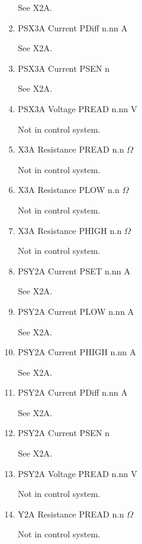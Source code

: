 \documentclass[11pt]{book}		%
\begin{document}
\begin{enumerate}
\color{red}
See X2A.
\color{black}

 \item PSX3A Current PDiff n.nn A

\color{red}
See X2A.
\color{black}

 \item PSX3A Current PSEN  n

\color{red}
See X2A.
\color{black}

 \item PSX3A Voltage PREAD n.nn V

\color{red}
Not in control system.
\color{black}

 \item X3A Resistance PREAD n.n $\Omega$

\color{red}
Not in control system.
\color{black}

 \item X3A Resistance PLOW n.n $\Omega$

\color{red}
Not in control system.
\color{black}

 \item X3A Resistance PHIGH n.n $\Omega$

\color{red}
Not in control system.
\color{black}

 \item PSY2A Current PSET  n.nn A

\color{red}
See X2A.
\color{black}

 \item PSY2A Current PLOW  n.nn A

\color{red}
See X2A.
\color{black}

 \item PSY2A Current PHIGH n.nn A

\color{red}
See X2A.
\color{black}

 \item PSY2A Current PDiff n.nn A

\color{red}
See X2A.
\color{black}

 \item PSY2A Current PSEN  n

\color{red}
See X2A.
\color{black}

 \item PSY2A Voltage PREAD n.nn V

\color{red}
Not in control system.
\color{black}

 \item Y2A Resistance PREAD n.n $\Omega$

\color{red}
Not in control system.
\color{black}


\end{enumerate}
\end{document}
